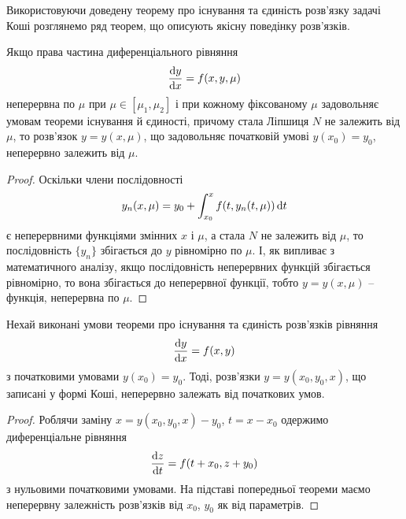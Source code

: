 Використовуючи доведену теорему про існування та єдиність роз\-в'яз\-ку задачі Коші розглянемо ряд теорем, що описують якісну поведінку роз\-в'яз\-ків.

\begin{theorem}
	Якщо права частина диференціального рівняння
	\begin{equation*}
		\frac{\mathop{}\!\mathrm{d} y}{\mathop{}\!\mathrm{d} x} = f(x, y, \mu)
	\end{equation*}
	неперервна по $\mu$ при $\mu \in [\mu_1, \mu_2]$ і при кожному фіксованому $\mu$ задовольняє умовам теореми існування й єдиності, причому стала Ліпшиця $N$ не залежить від $\mu$, то розв’язок $y = y(x, \mu)$, що задовольняє початковій умові $y(x_0)=y_0$, неперервно залежить від $\mu$.
\end{theorem}
\begin{proof} 
	Оскільки члени послідовності
	\begin{equation*}
		y_n(x, \mu) = y_0 + \int_{x_0}^x f(t, y_n(t, \mu)) \mathop{}\!\mathrm{d} t
	\end{equation*}
	є неперервними функціями змінних $x$ і $\mu$, а стала $N$ не залежить від $\mu$, то послідовність $\{y_n\}$ збігається до $y$ рівномірно по $\mu$. І, як випливає з математичного аналізу, якщо послідовність неперервних функцій збігається рівномірно, то вона збігається до неперервної функції, тобто $y=y(x,\mu)$ -- функція, неперервна по $\mu$.
\end{proof}

\begin{theorem}
	Нехай виконані умови теореми про існування та єдиність роз\-в'я\-зків рівняння
	\begin{equation*}
		\frac{\mathop{}\!\mathrm{d} y}{\mathop{}\!\mathrm{d} x} = f(x,y)
	\end{equation*}
	з початковими умовами $y(x_0) = y_0$. Тоді, розв’язки $y=y(x_0,y_0,x)$, що записані у формі Коші, неперервно залежать від початкових умов. 
\end{theorem}
\begin{proof}
	Роблячи заміну $x = y(x_0, y_0, x) - y_0$, $t = x - x_0$ одержимо диференціальне рівняння  
	\begin{equation*}
		\frac{\mathop{}\!\mathrm{d} z}{\mathop{}\!\mathrm{d} t} = f(t + x_0, z + y_0)
	\end{equation*}
	з нульовими початковими умовами. На підставі попередньої теореми маємо неперервну залежність розв’язків від $x_0$, $y_0$ як від параметрів.
\end{proof}

